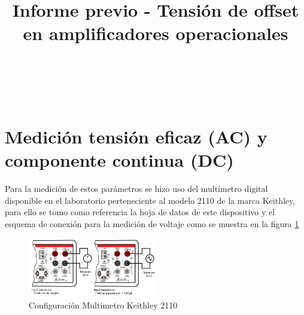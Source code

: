 \documentclass[conference]{IEEEtran}
\begin{document}
	
	\title{Informe previo - Tensión de offset en amplificadores operacionales}
	\author{
		\\
		\\
		\\
		\and
		\and
	}
	
	\maketitle
	\begin{abstract}
		
	\end{abstract}
	
	\begin{IEEEkeywords}
		
	\end{IEEEkeywords}
	
	\section{Medición tensión eficaz (AC) y componente continua (DC)}
	
	Para la medición de estos parámetros se hizo uso del multímetro digital disponible en el laboratorio perteneciente al modelo 2110 de la marca Keithley, para ello se tomo como referencia la hoja de datos de este dispositivo y el esquema de conexión para la medición de voltaje como se muestra en la figura \ref{fig:configuracion-multimetro}
	
	\begin{figure}[h]
		\centering
		\includegraphics[width=0.5\textwidth]{media/configuracion-multimetro}
		\caption{Configuración Multimetro Keithley 2110}
		\label{fig:configuracion-multimetro}
	\end{figure}
	
\end{document}
